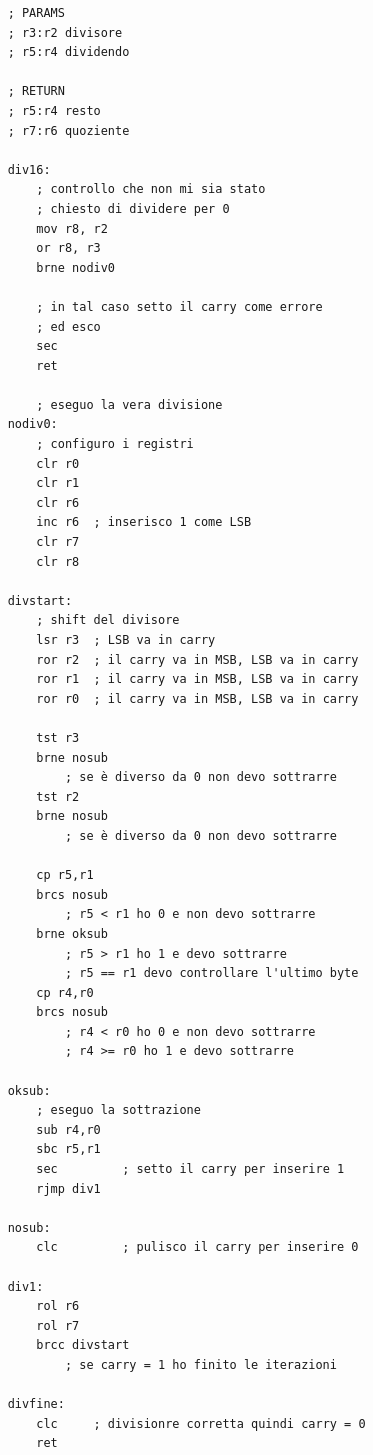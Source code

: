 \begin{verbatim}
    ; PARAMS
    ; r3:r2 divisore
    ; r5:r4 dividendo

    ; RETURN
    ; r5:r4 resto
    ; r7:r6 quoziente

    div16:
        ; controllo che non mi sia stato
        ; chiesto di dividere per 0
        mov r8, r2
        or r8, r3
        brne nodiv0

        ; in tal caso setto il carry come errore
        ; ed esco
        sec
        ret

        ; eseguo la vera divisione
    nodiv0:
        ; configuro i registri
        clr r0
        clr r1
        clr r6
        inc r6  ; inserisco 1 come LSB
        clr r7
        clr r8
        
    divstart:
        ; shift del divisore
        lsr r3  ; LSB va in carry
        ror r2  ; il carry va in MSB, LSB va in carry
        ror r1  ; il carry va in MSB, LSB va in carry
        ror r0  ; il carry va in MSB, LSB va in carry
        
        tst r3
        brne nosub
            ; se è diverso da 0 non devo sottrarre
        tst r2
        brne nosub
            ; se è diverso da 0 non devo sottrarre

        cp r5,r1
        brcs nosub
            ; r5 < r1 ho 0 e non devo sottrarre
        brne oksub
            ; r5 > r1 ho 1 e devo sottrarre 
            ; r5 == r1 devo controllare l'ultimo byte
        cp r4,r0
        brcs nosub
            ; r4 < r0 ho 0 e non devo sottrarre
            ; r4 >= r0 ho 1 e devo sottrarre
        
    oksub:
        ; eseguo la sottrazione
        sub r4,r0
        sbc r5,r1
        sec         ; setto il carry per inserire 1
        rjmp div1
        
    nosub:
        clc         ; pulisco il carry per inserire 0
        
    div1:
        rol r6
        rol r7
        brcc divstart
            ; se carry = 1 ho finito le iterazioni
        
    divfine:
        clc     ; divisionre corretta quindi carry = 0
        ret
\end{verbatim}

